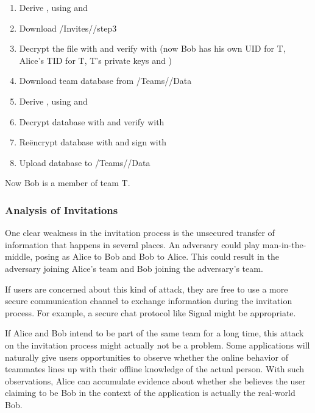 \documentclass[pldi-cameraready,10pt]{sigplanconf-pldi16}
\begin{document}
\begin{enumerate}
\item Derive , using  and 
\item Download \slash Invites\slash {}\slash step3
\item Decrypt the file with  and verify with  (now Bob has his own UID for T, Alice's TID for T, T's private keys and )
\item Download team database from \slash Teams\slash {}\slash Data
\item Derive , using  and 
\item Decrypt database with  and verify with 
\item Re\"{e}ncrypt database with  and sign with 
\item Upload database to \slash Teams\slash {}\slash Data
\end{enumerate}

Now Bob is a member of team T.

\subsubsection{Analysis of Invitations}

One clear weakness in the invitation process is the unsecured transfer of information that happens in several places.
An adversary could play man-in-the-middle, posing as Alice to Bob and Bob to Alice.
This could result in the adversary joining Alice's team and Bob joining the adversary's team.

If users are concerned about this kind of attack, they are free to use a more secure communication channel to exchange information during the invitation process.
For example, a secure chat protocol like Signal might be appropriate.

If Alice and Bob intend to be part of the same team for a long time, this attack on the invitation process might actually not be a problem.
Some applications will naturally give users opportunities to observe whether the online behavior of teammates lines up with their offline knowledge of the actual person.
With such observations, Alice can accumulate evidence about whether she believes the user claiming to be Bob in the context of the application is actually the real-world Bob.
\end{document}
